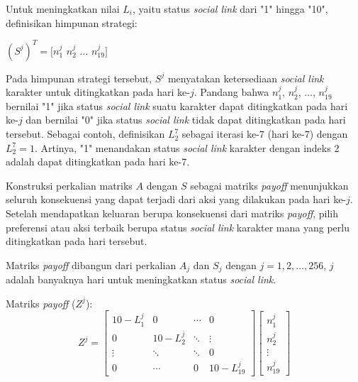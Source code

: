 Untuk meningkatkan nilai $L_{i}$, yaitu status \textit{social link} dari "1" hingga "10", definisikan himpunan strategi:
\begin{center}
    $(S^{j})^{T} = [n_1^{j}$ $n_2^{j}$ $\dots$ $n_{19}^{j}]$
\end{center}

Pada himpunan strategi tersebut, $S^{j}$ menyatakan ketersediaan \textit{social link} karakter untuk ditingkatkan pada hari ke-$j$. Pandang bahwa $n_1^{j}$, $n_2^{j}$, $\dots$, $n_{19}^{j}$ bernilai "1" jika status \textit{social link} suatu karakter dapat ditingkatkan pada hari ke-$j$ dan bernilai "0" jika status \textit{social link} tidak dapat ditingkatkan pada hari tersebut. Sebagai contoh, definisikan $L_{2}^{7}$ sebagai iterasi ke-7 (hari ke-7) dengan $L_{2}^{7} = 1$. Artinya, "1" menandakan status \textit{social link} karakter dengan indeks 2 adalah dapat ditingkatkan pada hari ke-7.

Konstruksi perkalian matriks $A$ dengan $S$ sebagai matriks \textit{payoff} menunjukkan seluruh konsekuensi yang dapat terjadi dari aksi yang dilakukan pada hari ke-$j$. Setelah mendapatkan keluaran berupa konsekuensi dari matriks \textit{payoff}, pilih preferensi atau aksi terbaik berupa status \textit{social link} karakter mana yang perlu ditingkatkan pada hari tersebut.

Matriks \textit{payoff} dibangun dari perkalian $A_{j}$ dan $S_{j}$ dengan $j = 1,2,\dots,256$, $j$ adalah banyaknya hari untuk meningkatkan status \textit{social link}.

Matriks \textit{payoff} ($Z^{j}$):
\[
    Z^{j} =
    \begin{bmatrix}
        10-L_{1}^{j} & 0            & \cdots & 0             \\
        0            & 10-L_{2}^{j} & \ddots & \vdots        \\
        \vdots       & \ddots       & \ddots & 0             \\
        0            & \cdots       & 0      & 10-L_{19}^{j}
    \end{bmatrix}
    \begin{bmatrix}
        n_{1}^{j} \\
        n_{2}^{j} \\
        \vdots    \\
        n_{19}^{j}
    \end{bmatrix}
\]

